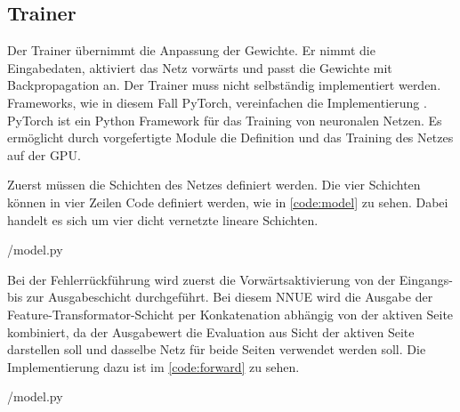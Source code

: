 \subsection{Trainer}
\label{chap:trainer}

Der Trainer übernimmt die Anpassung der Gewichte. Er nimmt die Eingabedaten, aktiviert das Netz vorwärts und passt die Gewichte mit Backpropagation an. Der Trainer muss nicht selbständig implementiert werden. Frameworks, wie in diesem Fall PyTorch, vereinfachen die Implementierung \cite{NEURIPS2019_9015}. PyTorch ist ein Python Framework für das Training von neuronalen Netzen. Es ermöglicht durch vorgefertigte Module die Definition und das Training des Netzes auf der GPU.

Zuerst müssen die Schichten des Netzes definiert werden. Die vier Schichten können in vier Zeilen Code definiert werden, wie in \autoref{code:model} zu sehen. Dabei handelt es sich um vier dicht vernetzte lineare Schichten.


{\srcloc/model.py}

Bei der Fehlerrückführung wird zuerst die Vorwärtsaktivierung von der Eingangs- bis zur Ausgabeschicht durchgeführt. Bei diesem \ac{NNUE} wird die Ausgabe der Feature-Transformator-Schicht per Konkatenation abhängig von der aktiven Seite kombiniert, da der Ausgabewert die Evaluation aus Sicht der aktiven Seite darstellen soll und dasselbe Netz für beide Seiten verwendet werden soll. Die Implementierung dazu ist im \autoref{code:forward} zu sehen.


{\srcloc/model.py}

